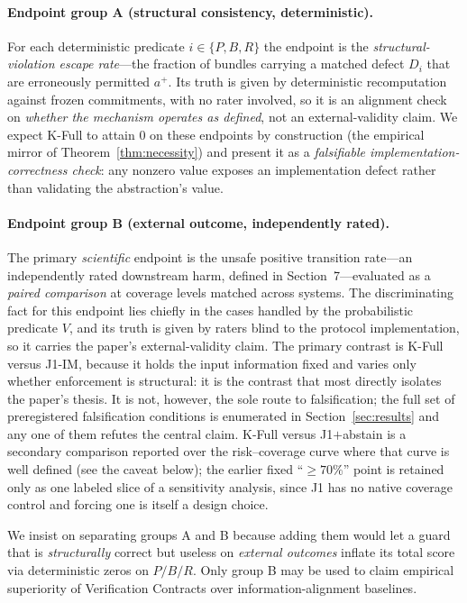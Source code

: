 \documentclass[sigconf,anonymous,review]{acmart}
\begin{document}
\paragraph{Endpoint group A (structural consistency, deterministic).} For each deterministic predicate $i\in\{P,B,R\}$ the endpoint is the \emph{structural-violation escape rate}---the fraction of bundles carrying a matched defect $D_i$ that are erroneously permitted $a^+$. Its truth is given by deterministic recomputation against frozen commitments, with no rater involved, so it is an alignment check on \emph{whether the mechanism operates as defined}, not an external-validity claim. We expect K-Full to attain 0 on these endpoints by construction (the empirical mirror of Theorem~\ref{thm:necessity}) and present it as a \emph{falsifiable implementation-correctness check}: any nonzero value exposes an implementation defect rather than validating the abstraction's value.

\paragraph{Endpoint group B (external outcome, independently rated).} The primary \emph{scientific} endpoint is the unsafe positive transition rate---an independently rated downstream harm, defined in Section~7---evaluated as a \emph{paired comparison} at coverage levels matched across systems. The discriminating fact for this endpoint lies chiefly in the cases handled by the probabilistic predicate $V$, and its truth is given by raters blind to the protocol implementation, so it carries the paper's external-validity claim. The primary contrast is K-Full versus J1-IM, because it holds the input information fixed and varies only whether enforcement is structural: it is the contrast that most directly isolates the paper's thesis. It is not, however, the sole route to falsification; the full set of preregistered falsification conditions is enumerated in Section~\ref{sec:results} and any one of them refutes the central claim. K-Full versus J1$+$abstain is a secondary comparison reported over the risk--coverage curve where that curve is well defined (see the caveat below); the earlier fixed ``$\geq 70\%$'' point is retained only as one labeled slice of a sensitivity analysis, since J1 has no native coverage control and forcing one is itself a design choice.

We insist on separating groups A and B because adding them would let a guard that is \emph{structurally} correct but useless on \emph{external outcomes} inflate its total score via deterministic zeros on $P/B/R$. Only group B may be used to claim empirical superiority of Verification Contracts over information-alignment baselines.
\end{document}
